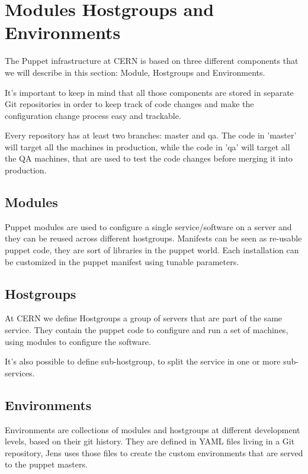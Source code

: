 \section{Modules Hostgroups and Environments}

The Puppet infrastructure at CERN is based on three different components
that we will describe in this section: Module, Hostgroups and
Environments.

It's important to keep in mind that all those components are stored in
separate Git repositories in order to keep track of code changes and make
the configuration change process easy and trackable.

Every repository has at least two branches: master and qa. The code in
'master' will target all the machines in production, while the code in
'qa' will target all the QA machines, that are used to test the code
changes before merging it into production.

\subsection{Modules}

Puppet modules are used to configure a single service/software on a server
and they can be reused across different hostgroups. Manifests can be seen
as re-usable puppet code, they are sort of libraries in the puppet world.
Each installation can be customized in the puppet manifest using tunable
parameters.

\subsection{Hostgroups}

At CERN we define Hostgroups a group of servers that are part of the same
service. They contain the puppet code to configure and run a set of
machines, using modules to configure the software.

It's also possible to define sub-hostgroup, to split the service in one or
more sub-services.


\subsection{Environments}

Environments are collections of modules and hostgroups at different
development levels, based on their git history. They are defined in YAML
files living in a Git repository, Jens uses those files to create the
custom environments that are served to the puppet masters.

